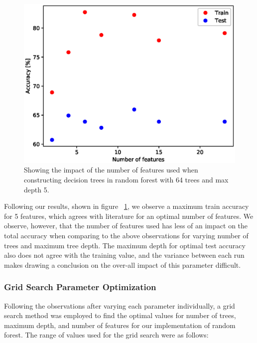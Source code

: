 \documentclass{article} %
\begin{document}
\begin{figure}[ht]
\begin{center}
\includegraphics[scale=0.4]{n_features}
\end{center}
\caption{Showing the impact of the number of features used when constructing decision trees in random forest with 64 trees and max depth 5.}
\label{fig:n_features}
\end{figure}

Following our results, shown in figure ~\ref{fig:n_features}, we observe a maximum train accuracy for 5 features, which agrees with literature for an optimal number of features. We observe, however, that the number of features used has less of an impact on the total accuracy when comparing to the above observations for varying number of trees and maximum tree depth. The maximum depth for optimal test accuracy also does not agree with the training value, and the variance between each run makes drawing a conclusion on the over-all impact of this parameter difficult.

\subsubsection{Grid Search Parameter Optimization}

Following the observations after varying each parameter individually, a grid search method was employed to find the optimal values for number of trees, maximum depth, and number of features for our implementation of random forest. The range of values used for the grid search were as follows:
\end{document}

